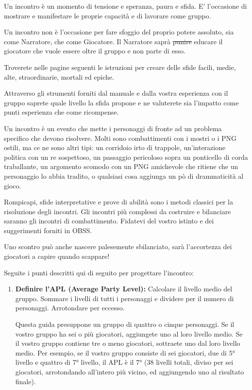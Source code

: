 \documentclass[a4paper,twoside,openany]{book}
\begin{document}
\begin{multicols}{2}

Un incontro è un momento di tensione e speranza, paura e sfida. E' l'occasione di mostrare e manifestare le proprie capacità e di lavorare come gruppo.

Un incontro non è l'occasione per fare sfoggio del proprio potere assoluto, sia come Narratore, che come Giocatore. Il Narratore saprà \st{punire} educare il giocatore che vuole essere oltre il gruppo e non parte di esso.

Troverete nelle pagine seguenti le istruzioni per creare delle sfide facili, medie, alte, straordinarie, mortali ed epiche.

Attraverso gli strumenti forniti dal manuale e dalla vostra esperienza con il gruppo saprete quale livello la sfida propone e ne valuterete sia l'impatto come punti esperienza che come ricompense.

Un incontro è un evento che mette i personaggi di fronte ad un problema specifico che devono risolvere. Molti sono combattimenti con i mostri o i PNG ostili, ma ce ne sono altri tipi: un corridoio irto di trappole, un'interazione politica con un re sospettoso, un passaggio pericoloso sopra un ponticello di corda traballante, un argomento scomodo con un PNG amichevole che ritiene che un personaggio lo abbia tradito, o qualsiasi cosa aggiunga un pò di drammaticità al gioco.

Rompicapi, sfide interpretative e prove di abilità sono i metodi classici per la risoluzione degli incontri. Gli incontri più complessi da costruire e bilanciare saranno gli incontri di combattimento. Fidatevi del vostro istinto e dei suggerimenti forniti in OBSS.

Uno scontro può anche nascere palesemente sbilanciato, sarà l'accortezza dei giocatori a capire quando scappare!

Seguite i punti descritti qui di seguito per progettare l'incontro:

\begin{enumerate}[leftmargin=*] \setlength{\itemsep}{0pt}
	\item \textbf{Definire l'APL (Average Party Level):} Calcolare il livello medio del gruppo. Sommare i livelli di tutti i personaggi e dividere per il numero di personaggi. Arrotondare per eccesso.

	Questa guida presuppone un gruppo di quattro o cinque personaggi. Se il vostro gruppo ha sei o più giocatori, aggiungete uno al loro livello medio. Se il vostro gruppo contiene tre o meno giocatori, sottraete uno dal loro livello medio. Per esempio, se il vostro gruppo consiste di sei giocatori, due di 5° livello e quattro di 7° livello, il APL è il 7° (38 livelli totali, diviso per sei giocatori, arrotondando all'intero più vicino, ed aggiungendo uno al risultato finale).


\end{enumerate}
\end{multicols}
\end{document}
